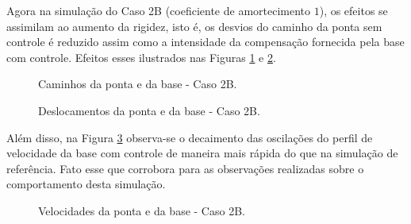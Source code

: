 Agora na simulação do Caso 2B (coeficiente de amortecimento \(1\)), os efeitos se assimilam ao aumento da rigidez, isto é, os desvios do caminho da ponta sem controle é reduzido assim como a intensidade da compensação fornecida pela base com controle. Efeitos esses ilustrados nas Figuras \ref{fig:2B_cam} e \ref{fig:2B_des}.

\begin{figure}[H]
    \centering
    \hfill
    \hfill
    \hfill
    \caption{Caminhos da ponta e da base - Caso 2B.}
    \label{fig:2B_cam}
\end{figure}

\begin{figure}[H]
    \centering
    \hfill
    \caption{Deslocamentos da ponta e da base - Caso 2B.}
    \label{fig:2B_des}
\end{figure}

Além disso, na Figura \ref{fig:2B_vel} observa-se o decaimento das oscilações do perfil de velocidade da base com controle de maneira mais rápida do que na simulação de referência. Fato esse que corrobora para as observações realizadas sobre o comportamento desta simulação.

\begin{figure}[H]
    \centering
    \hfill
    \caption{Velocidades da ponta e da base - Caso 2B.}
    \label{fig:2B_vel}
\end{figure}

